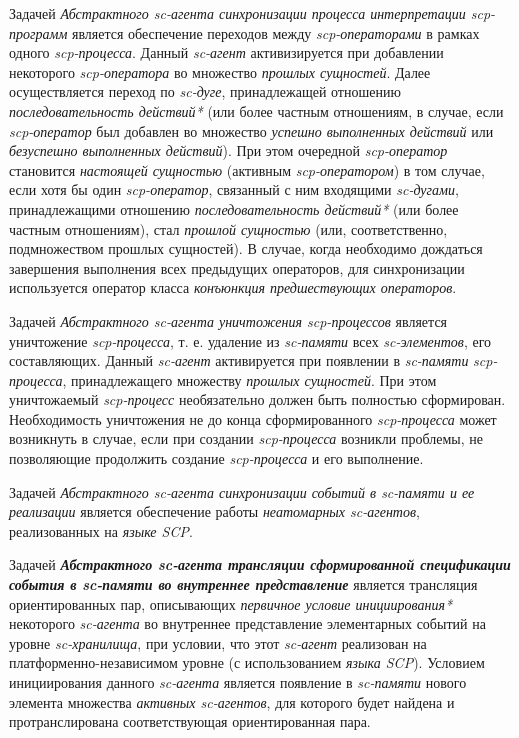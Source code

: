 Задачей \textit{Абстрактного sc-агента синхронизации процесса интерпретации scp-программ} является обеспечение переходов между \textit{scp-операторами} в рамках одного \textit{scp-процесса}. Данный \textit{sc-агент} активизируется при добавлении некоторого \textit{scp-оператора} во множество \textit{прошлых сущностей}. Далее осуществляется переход по \textit{sc-дуге}, принадлежащей отношению \textit{последовательность действий*} (или более частным отношениям, в случае, если \textit{\mbox{scp-оператор}} был добавлен во множество \textit{успешно выполненных действий} или \textit{безуспешно выполненных действий}). При этом очередной \textit{scp-оператор} становится \textit{настоящей сущностью} (активным \textit{scp-оператором}) в том случае, если хотя бы один \textit{scp-оператор}, связанный с ним входящими \textit{sc-дугами}, принадлежащими отношению \textit{последовательность действий*} (или более частным отношениям), стал \textit{прошлой сущностью} (или, соответственно, подмножеством прошлых сущностей). В случае, когда необходимо дождаться завершения выполнения всех предыдущих операторов, для синхронизации используется оператор класса \textit{конъюнкция предшествующих операторов}.

Задачей \textit{Абстрактного sc-агента уничтожения scp-процессов} является уничтожение \textit{scp-процесса}, т. е. удаление из \textit{sc-памяти} всех \textit{sc-элементов}, его составляющих. Данный \textit{sc-агент} активируется при появлении в \textit{sc-памяти} \textit{scp-процесса}, принадлежащего множеству \textit{прошлых сущностей}.
При этом уничтожаемый \textit{scp-процесс} необязательно должен быть полностью сформирован. Необходимость уничтожения не до конца сформированного \textit{scp-процесса} может возникнуть в случае, если при создании \textit{scp-процесса} возникли проблемы, не позволяющие продолжить создание \textit{scp-процесса} и его выполнение.

Задачей \textit{Абстрактного sc-агента синхронизации событий в sc-памяти и ее реализации} является обеспечение работы \textit{неатомарных sc-агентов}, реализованных на \textit{языке SCP}.

Задачей \textit{\textbf{Абстрактного sc-агента трансляции сформированной спецификации события в sc-памяти во внутреннее представление}} является трансляция ориентированных пар, описывающих \textit{первичное условие инициирования*} некоторого \textit{\mbox{sc-агента}} во внутреннее представление элементарных событий на уровне \textit{\mbox{sc-хранилища}}, при условии, что этот \textit{sc-агент} реализован на платформенно-независимом уровне (с использованием \textit{языка SCP}). Условием инициирования данного \textit{sc-агента} является появление в \textit{\mbox{sc-памяти}} нового элемента множества \textit{активных sc-агентов}, для которого будет найдена и протранслирована соответствующая ориентированная пара.

